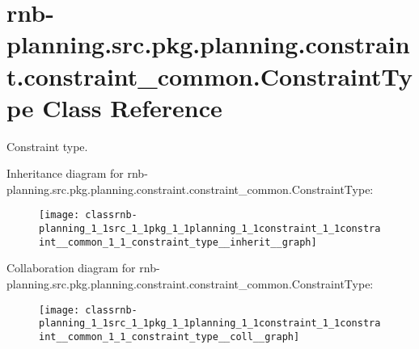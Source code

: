 \hypertarget{classrnb-planning_1_1src_1_1pkg_1_1planning_1_1constraint_1_1constraint__common_1_1_constraint_type}{}\section{rnb-\/planning.src.\+pkg.\+planning.\+constraint.\+constraint\+\_\+common.\+Constraint\+Type Class Reference}
\label{classrnb-planning_1_1src_1_1pkg_1_1planning_1_1constraint_1_1constraint__common_1_1_constraint_type}


Constraint type.  




Inheritance diagram for rnb-\/planning.src.\+pkg.\+planning.\+constraint.\+constraint\+\_\+common.\+Constraint\+Type\+:\nopagebreak
\begin{figure}[H]
\begin{center}
\leavevmode
\texttt{[image: classrnb-planning\_1\_1src\_1\_1pkg\_1\_1planning\_1\_1constraint\_1\_1constraint\_\_common\_1\_1\_constraint\_type\_\_inherit\_\_graph]}
\end{center}
\end{figure}


Collaboration diagram for rnb-\/planning.src.\+pkg.\+planning.\+constraint.\+constraint\+\_\+common.\+Constraint\+Type\+:\nopagebreak
\begin{figure}[H]
\begin{center}
\leavevmode
\texttt{[image: classrnb-planning\_1\_1src\_1\_1pkg\_1\_1planning\_1\_1constraint\_1\_1constraint\_\_common\_1\_1\_constraint\_type\_\_coll\_\_graph]}
\end{center}
\end{figure}
